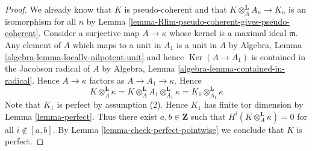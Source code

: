 \documentclass[10pt,a4paper]{amsart}
\theoremstyle{plain}
\theoremstyle{definition}
\theoremstyle{remark}
\numberwithin{equation}{subsection}
\def\Ker{\mathop{\mathrm{Ker}}}
\begin{document}
\begin{proof}
We already know that $K$ is pseudo-coherent and that
$K \otimes_A^\mathbf{L} A_n \to K_n$ is an isomorphism for all $n$
by Lemma \ref{lemma-Rlim-pseudo-coherent-gives-pseudo-coherent}.
Consider a surjective map $A \to \kappa$ whose kernel is
a maximal ideal $\mathfrak m$.
Any element of $A$ which maps to a unit in $A_1$ is a unit
in $A$ by Algebra, Lemma \ref{algebra-lemma-locally-nilpotent-unit}
and hence $\Ker(A \to A_1)$ is contained in the Jacobson radical of $A$ by
Algebra, Lemma \ref{algebra-lemma-contained-in-radical}.
Hence $A \to \kappa$ factors as $A \to A_1 \to \kappa$.
Hence
$$
K \otimes_A^\mathbf{L} \kappa =
K \otimes_A^\mathbf{L} A_1 \otimes_{A_1}^\mathbf{L} \kappa =
K_1 \otimes_{A_1}^\mathbf{L} \kappa
$$
Note that $K_1$ is perfect by assumption (2). Hence
$K_1$ has finite tor dimension by Lemma \ref{lemma-perfect}.
Thus there exist $a, b \in \mathbf{Z}$ such that
$H^i(K \otimes_A^\mathbf{L} \kappa) = 0$ for all $i \not \in [a, b]$.
By Lemma \ref{lemma-check-perfect-pointwise}
we conclude that $K$ is perfect.
\end{proof}
\end{document}
